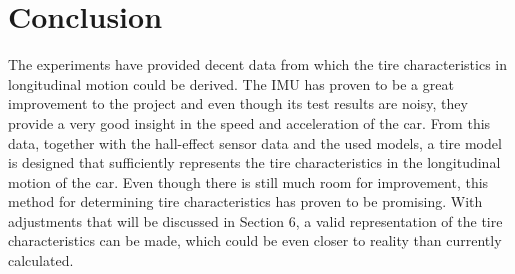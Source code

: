 \section{Conclusion}
The experiments have provided decent data from which the tire characteristics in longitudinal motion could be derived. The IMU has proven to be a great improvement to the project and even though its test results are noisy, they provide a very good insight in the speed and acceleration of the car. From this data, together with the hall-effect sensor data and the used models, a tire model is designed that sufficiently represents the tire characteristics in the longitudinal motion of the car. 
	Even though there is still much room for improvement, this method for determining tire characteristics has proven to be promising. With adjustments that will be discussed in Section 6, a valid representation of the tire characteristics can be made, which could be even closer to reality than currently calculated.